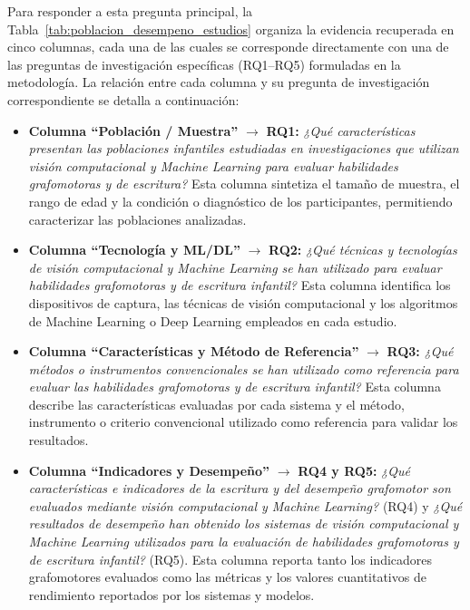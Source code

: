\documentclass{iaesarticle}
\begin{document}
Para responder a esta pregunta principal, la Tabla~\ref{tab:poblacion_desempeno_estudios} organiza la evidencia recuperada en cinco columnas, cada una de las cuales se corresponde directamente con una de las preguntas de investigación específicas (RQ1--RQ5) formuladas en la metodología. La relación entre cada columna y su pregunta de investigación correspondiente se detalla a continuación:
\begin{itemize}
    \item \textbf{Columna ``Población / Muestra''} $\rightarrow$ \textbf{RQ1:} \textit{¿Qué características presentan las poblaciones infantiles estudiadas en investigaciones que utilizan visión computacional y Machine Learning para evaluar habilidades grafomotoras y de escritura?} Esta columna sintetiza el tamaño de muestra, el rango de edad y la condición o diagnóstico de los participantes, permitiendo caracterizar las poblaciones analizadas.

    \item \textbf{Columna ``Tecnología y ML/DL''} $\rightarrow$ \textbf{RQ2:} \textit{¿Qué técnicas y tecnologías de visión computacional y Machine Learning se han utilizado para evaluar habilidades grafomotoras y de escritura infantil?} Esta columna identifica los dispositivos de captura, las técnicas de visión computacional y los algoritmos de Machine Learning o Deep Learning empleados en cada estudio.

    \item \textbf{Columna ``Características y Método de Referencia''} $\rightarrow$ \textbf{RQ3:} \textit{¿Qué métodos o instrumentos convencionales se han utilizado como referencia para evaluar las habilidades grafomotoras y de escritura infantil?} Esta columna describe las características evaluadas por cada sistema y el método, instrumento o criterio convencional utilizado como referencia para validar los resultados.

    \item \textbf{Columna ``Indicadores y Desempeño''} $\rightarrow$ \textbf{RQ4 y RQ5:} \textit{¿Qué características e indicadores de la escritura y del desempeño grafomotor son evaluados mediante visión computacional y Machine Learning?} (RQ4) y \textit{¿Qué resultados de desempeño han obtenido los sistemas de visión computacional y Machine Learning utilizados para la evaluación de habilidades grafomotoras y de escritura infantil?} (RQ5). Esta columna reporta tanto los indicadores grafomotores evaluados como las métricas y los valores cuantitativos de rendimiento reportados por los sistemas y modelos.
\end{itemize}
\end{document}
